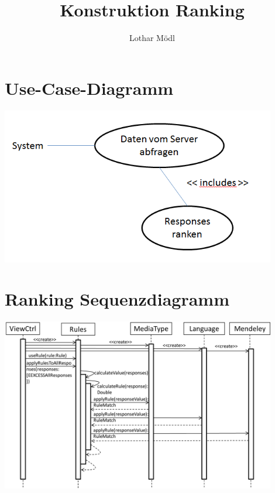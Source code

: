 \documentclass[a4paper,10pt]{article}
\title{Konstruktion Ranking}
\author{Lothar Mödl}
\begin{document}
\maketitle

\begin{abstract}

\end{abstract}

\section{Use-Case-Diagramm}

\includegraphics[width=12cm]{Pics/use-case}

\section{Ranking Sequenzdiagramm}

\includegraphics[width=12cm]{Pics/Sequenzdiagramm_Ranking}
\end{document}
